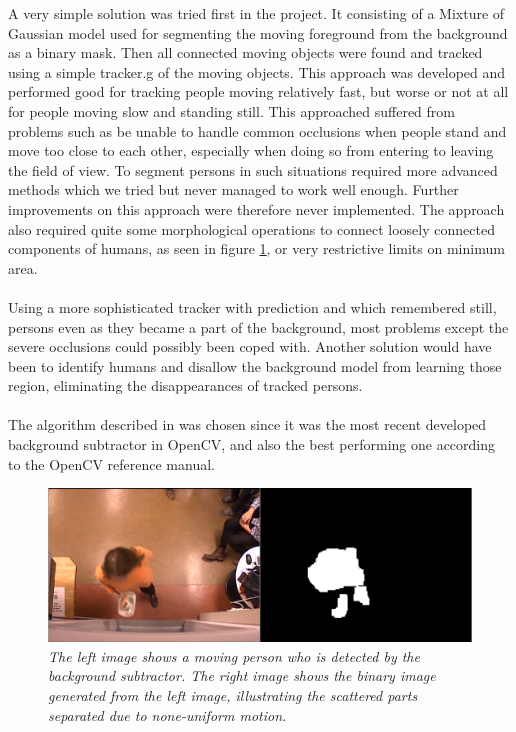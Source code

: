 
A very simple solution was tried first in the project. It consisting of a Mixture of Gaussian model\cite{Gardel} used for segmenting the moving foreground from the background as a binary mask. Then all connected moving objects were found and tracked using a simple tracker.g of the moving objects. This approach was developed and performed good for tracking people moving relatively fast, but worse or not at all for people moving slow and standing still. This approached suffered from problems such as be unable to handle common occlusions when people stand and move too close to each other, especially when doing so from entering to leaving the field of view. To segment persons in such situations required more advanced methods which we tried but never managed to work well enough. Further improvements on this approach were therefore never implemented. The approach also required quite some morphological operations to connect loosely connected components of humans, as seen in figure \ref{fig:bg_success}, or very restrictive limits on minimum area.\\\\
Using a more sophisticated tracker with prediction and which remembered still, persons even as they became a part of the background, most problems except the severe occlusions could possibly been coped with. Another solution would have been to identify humans and disallow the background model from learning those region, eliminating the disappearances of tracked persons. \\\\
The algorithm described in \cite{Gardel} was chosen since it was the most recent developed background subtractor in OpenCV, and also the best performing one according to the OpenCV reference manual. 

\vspace{1cm}
\begin{figure}[htb]
	\centering
	\includegraphics[width=\linewidth]{images/bg_success.png}
	\caption[An example of scattered binary mask of a human from the background model.]{\textit{The left image shows a moving person who is detected by the background subtractor. The right image shows the binary image generated from the left image, illustrating the scattered parts separated due to none-uniform motion.
	}}
	\label{fig:bg_success}  %
\end{figure}

